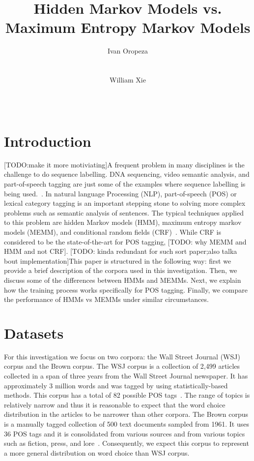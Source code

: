 \documentclass{acm_proc_article-sp}
\begin{document}
\author{
\alignauthor
Ivan Oropeza\\
       \\
       \\
\alignauthor
William Xie\\
       \\
       \\
}

\title{Hidden Markov Models vs. Maximum Entropy Markov Models}


\maketitle
\section{Introduction}
[TODO:make it more motiviating]A frequent problem in many disciplines is the challenge to do sequence labelling. DNA sequencing, video semantic analysis, and part-of-speech tagging are just some of the examples where sequence labelling is being used.~\cite{dnaEx, videoEx, nlpEx}. In natural language Processing (NLP), part-of-speech (POS) or lexical category tagging is an important stepping stone to solving more complex problems such as semantic analysis of sentences. The typical techniques applied to this problem are hidden Markov models (HMM), maximum entropy markov models (MEMM), and conditional random fields (CRF)~\cite{nlpBook}. While CRF is considered to be the state-of-the-art for POS tagging, [TODO: why MEMM and HMM and not CRF]. [TODO: kinda redundant for such sort paper;also talka bout implementation]This paper is structured in the following way: first we provide a brief description of the corpora used in this investigation. Then, we discuss some of the differences between HMMs and MEMMs. Next, we explain how the training process works specifically for POS tagging. Finally, we compare the performance of HMMs vs MEMMs under similar circumstances.

\section{Datasets}
For this investigation we focus on two corpora: the Wall Street Journal (WSJ) corpus and the Brown corpus. The WSJ corpus is a collection of 2,499 articles collected in a span of three years from the Wall Street Journal newspaper. It has approximately 3 million words and was tagged by using statistically-based methods. This corpus has a total of 82 possible POS tags~\cite{wsjCorpus}. The range of topics is relatively narrow and thus it is reasonable to expect that the word choice distribution in the articles to be narrower than other corpora. The Brown corpus is a manually tagged collection of 500 text documents sampled from 1961. It uses 36 POS tags and it is consolidated from various sources and from various topics such as fiction, press, and lore~\cite{brownCorpus}. Consequently, we expect this corpus to represent a more general distribution on word choice than WSJ corpus.
\end{document}
